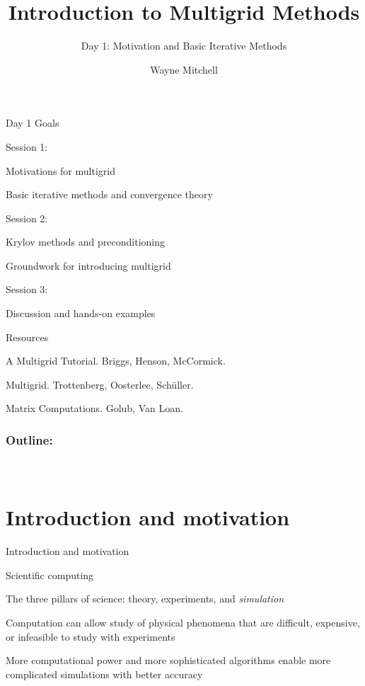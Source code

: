 \documentclass[18pt,xcolor=table]{beamer}
\title[Multigrid]{Introduction to Multigrid Methods}
\subtitle{Day 1: Motivation and Basic Iterative Methods}
\author[Mitchell]{Wayne Mitchell}
\institute{\pgfuseimage{logo}\\Universit\"at Heidelberg\\Institut f\"ur Technische Informatik}
\date[]{\alert{}}
\begin{document}


\DeclareRobustCommand{\Chi}{\raisebox{2pt}{$\chi$}}

\begin{frame}{}
\begin{block}{Day 1 Goals}
\bit
\item Session 1:
\bit
\item Motivations for multigrid
\item Basic iterative methods and convergence theory
\eit
\item Session 2:
\bit
\item Krylov methods and preconditioning
\item Groundwork for introducing multigrid
\eit
\item Session 3:
\bit
\item Discussion and hands-on examples
\eit
\eit
\end{block}
\end{frame}

\begin{frame}{}
\begin{block}{Resources}
\bit
\item A Multigrid Tutorial. Briggs, Henson, McCormick.
\item Multigrid. Trottenberg, Oosterlee, Sch\"uller.
\item Matrix Computations. Golub, Van Loan.
\eit
\end{block}
\end{frame}

\begin{frame}
\frametitle{\bf Outline:}
\framesubtitle{~~}
\tableofcontents
\end{frame}


\section{Introduction and motivation}


\begin{frame}{Introduction and motivation}
\begin{block}{Scientific computing}
\bit
\item The three pillars of science: theory, experiments, and \emph{simulation}
\item Computation can allow study of physical phenomena that are difficult, expensive, or infeasible to study with experiments
\item More computational power and more sophisticated algorithms enable more complicated simulations with better accuracy
\eit
\end{block}
\end{frame}
\end{document}
